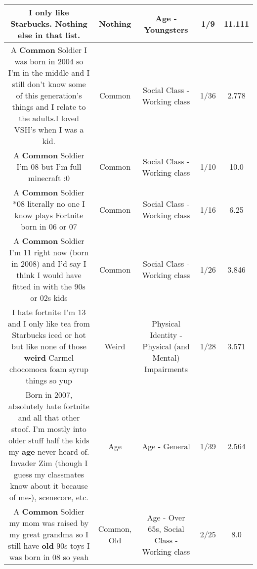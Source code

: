 \documentclass[11pt]{article}
\newlength\mylength
\begin{document}
\begin{center}
\begin{longtable}{|C{.65\mylength}|C{.30\mylength}|C{.12\mylength}|C{.12\mylength}|C{.12\mylength}|}
  \small I only like Starbucks. \textbf{Nothing} else in that list.\normalsize   & Nothing & Age - Youngsters & 1/9 & 11.111 \\  \hline
  \small A \textbf{Common} Soldier I was born in 2004 so I'm in the middle and I still don't know some of this generation's things and I relate to the adults.I loved VSH's when I was a kid.\normalsize   & Common & Social Class - Working class & 1/36 & 2.778 \\  \hline
  \small A \textbf{Common} Soldier I'm 08 but I'm full minecraft :0\normalsize   & Common & Social Class - Working class & 1/10 & 10.0 \\  \hline
  \small A \textbf{Common} Soldier *08 literally no one I know plays Fortnite born in 06 or 07\normalsize   & Common & Social Class - Working class & 1/16 & 6.25 \\  \hline
  \small A \textbf{Common} Soldier I'm 11 right now (born in 2008) and I'd say I think I would have fitted in with the 90s or 02s kids\normalsize   & Common & Social Class - Working class & 1/26 & 3.846 \\  \hline
  \small I hate fortnite I'm 13 and I only like tea from Starbucks iced or hot but like none of those \textbf{weird} Carmel chocomoca foam syrup things so yup\normalsize   & Weird & Physical Identity - Physical (and Mental) Impairments & 1/28 & 3.571 \\  \hline
  \small Born in 2007, absolutely hate fortnite and all that other stoof. I'm mostly into older stuff half the kids my \textbf{age} never heard of. Invader Zim (though I guess my classmates know about it because of me-), scenecore, etc.\normalsize   & Age & Age - General & 1/39 & 2.564 \\  \hline
  \small A \textbf{Common} Soldier my mom was raised by my great grandma so I still have \textbf{old} 90s toys I was born in 08 so yeah\normalsize   & Common, Old & Age - Over 65s, Social Class - Working class & 2/25 & 8.0 \\  \hline

\end{longtable}
\end{center}
\end{document}
